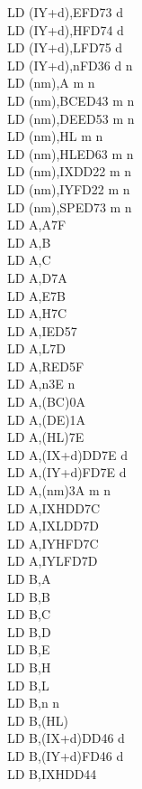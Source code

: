 \begin{multicols}{3}
{\begin{tabbing}
		LD (IY+d),E\>FD73 d\\
		LD (IY+d),H\>FD74 d\\
		LD (IY+d),L\>FD75 d\\
		LD (IY+d),n\>FD36 d n\\
		LD (nm),A m n\\
		LD (nm),BC\>ED43 m n\\
		LD (nm),DE\>ED53 m n\\
		LD (nm),HL m n\\
		LD (nm),HL\>ED63 m n\\
		LD (nm),IX\>DD22 m n\\
		LD (nm),IY\>FD22 m n\\
		LD (nm),SP\>ED73 m n\\
		LD A,A\>7F\\
		LD A,B\\
		LD A,C\\
		LD A,D\>7A\\
		LD A,E\>7B\\
		LD A,H\>7C\\
		LD A,I\>ED57\\
		LD A,L\>7D\\
		LD A,R\>ED5F\\
		LD A,n\>3E n\\
		LD A,(BC)\>0A\\
		LD A,(DE)\>1A\\
		LD A,(HL)\>7E\\
		LD A,(IX+d)\>DD7E d\\
		LD A,(IY+d)\>FD7E d\\
		LD A,(nm)\>3A m n\\
		LD A,IXH\UNDOC\>DD7C\\
		LD A,IXL\UNDOC\>DD7D\\
		LD A,IYH\UNDOC\>FD7C\\
		LD A,IYL\UNDOC\>FD7D\\
		LD B,A\\
		LD B,B\\
		LD B,C\\
		LD B,D\\
		LD B,E\\
		LD B,H\\
		LD B,L\\
		LD B,n n\\
		LD B,(HL)\\
		LD B,(IX+d)\>DD46 d\\
		LD B,(IY+d)\>FD46 d\\
		LD B,IXH\UNDOC\>DD44\\

\end{tabbing}}
\end{multicols}
